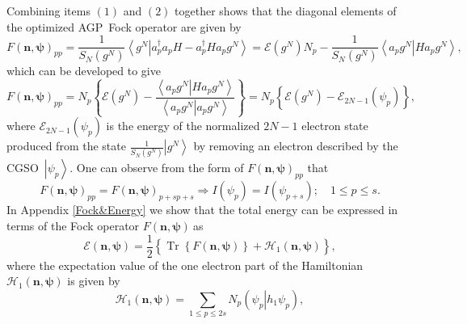 \documentclass[aps,preprint]{revtex4}%
\begin{document}
Combining items $\left(  1\right)  $ and $\left(  2\right)  $ together shows
that the diagonal elements of the optimized AGP\ Fock operator are given by
\begin{equation}
F\left(  \mathbf{n},\mathbf{\psi}\right)  _{pp}=\frac{1}{S_{N}\left(
g^{N}\right)  }\left\langle \left.  g^{N}\right\vert a_{p}^{\dagger}%
a_{p}H-a_{p}^{\dagger}Ha_{p}g^{N}\right\rangle =\mathcal{E}\left(
g^{N}\right)  N_{p}-\frac{1}{S_{N}\left(  g^{N}\right)  }\left\langle \left.
a_{p}g^{N}\right\vert Ha_{p}g^{N}\right\rangle ,
\end{equation}
which can be developed to give
\begin{equation}
F\left(  \mathbf{n},\mathbf{\psi}\right)  _{pp}=N_{p}\left\{  \mathcal{E}%
\left(  g^{N}\right)  -\frac{\left\langle \left.  a_{p}g^{N}\right\vert
Ha_{p}g^{N}\right\rangle }{\left\langle \left.  a_{p}g^{N}\right\vert
a_{p}g^{N}\right\rangle }\right\}  =N_{p}\left\{  \mathcal{E}\left(
g^{N}\right)  -\mathcal{E}_{2N-1}\left(  \psi_{p}\right)  \right\}  ,
\end{equation}
where $\mathcal{E}_{2N-1}\left(  \psi_{p}\right)  $ is the energy of the
normalized $2N-1$ electron state produced from the state $\frac{1}%
{S_{N}\left(  g^{N}\right)  }\left\vert g^{N}\right\rangle $ by removing an
electron described by the CGSO\ $\left\vert \psi_{p}\right\rangle $. One can
observe from the form of $F\left(  \mathbf{n},\mathbf{\psi}\right)  _{pp}$
that
\begin{equation}
F\left(  \mathbf{n},\mathbf{\psi}\right)  _{pp}=F\left(  \mathbf{n}%
,\mathbf{\psi}\right)  _{p+sp+s}\Rightarrow I\left(  \psi_{p}\right)
=I\left(  \psi_{p+s}\right)  ;\quad1\leq p\leq s.
\end{equation}
In Appendix \ref{Fock&Energy} we show that the total energy can be expressed
in terms of the Fock operator $F\left(  \mathbf{n},\mathbf{\psi}\right)
\ $as
\begin{equation}
\mathcal{E}\left(  \mathbf{n},\mathbf{\psi}\right)  =\frac{1}{2}\left\{
\overset{}{\operatorname{Tr}\left\{  F\left(  \mathbf{n},\mathbf{\psi}\right)
\right\}  +\mathcal{H}_{1}\left(  \mathbf{n},\mathbf{\psi}\right)  }\right\}
,
\end{equation}
where the expectation value of the one electron part of the Hamiltonian
$\mathcal{H}_{1}\left(  \mathbf{n},\mathbf{\psi}\right)  $ is given by
\begin{equation}
\mathcal{H}_{1}\left(  \mathbf{n},\mathbf{\psi}\right)  =\sum_{1\leq p\leq
2s}N_{p}\left(  \left.  \psi_{p}\right\vert h_{1}\psi_{p}\right)  ,
\end{equation}
\end{document}
